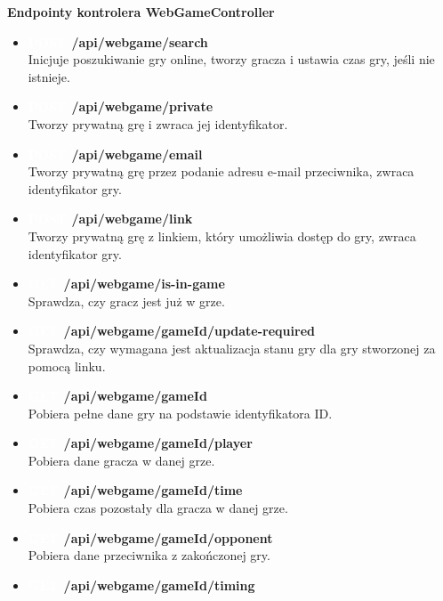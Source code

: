 \documentclass[12pt,a4paper]{article}
\begin{document}
\noindent  \textbf{Endpointy kontrolera WebGameController}
\begin{itemize} 
    \item \textbf{\colorbox{green!90}{\textcolor{white}{POST}} /api/webgame/search} \\
    Inicjuje poszukiwanie gry online, tworzy gracza i ustawia czas gry, jeśli nie istnieje. 
    \item \textbf{\colorbox{green!90}{\textcolor{white}{POST}} /api/webgame/private} \\
    Tworzy prywatną grę i zwraca jej identyfikator. 
    \item \textbf{\colorbox{green!90}{\textcolor{white}{POST}} /api/webgame/email} \\
    Tworzy prywatną grę przez podanie adresu e-mail przeciwnika, zwraca identyfikator gry. 
    \item \textbf{\colorbox{green!90}{\textcolor{white}{POST}} /api/webgame/link} \\
    Tworzy prywatną grę z linkiem, który umożliwia dostęp do gry, zwraca identyfikator gry. 
    \item \textbf{\colorbox{cyan!90}{\textcolor{white}{GET}} /api/webgame/is-in-game} \\
    Sprawdza, czy gracz jest już w grze. 
    \item \textbf{\colorbox{cyan!90}{\textcolor{white}{GET}} /api/webgame/{gameId}/update-required} \\
    Sprawdza, czy wymagana jest aktualizacja stanu gry dla gry stworzonej za pomocą linku. 
    \item \textbf{\colorbox{cyan!90}{\textcolor{white}{GET}} /api/webgame/{gameId}} \\
    Pobiera pełne dane gry na podstawie identyfikatora ID. 
    \item \textbf{\colorbox{cyan!90}{\textcolor{white}{GET}} /api/webgame/{gameId}/player} \\
    Pobiera dane gracza w danej grze. 
    \item \textbf{\colorbox{cyan!90}{\textcolor{white}{GET}} /api/webgame/{gameId}/time} \\
    Pobiera czas pozostały dla gracza w danej grze. 
    \item \textbf{\colorbox{cyan!90}{\textcolor{white}{GET}} /api/webgame/{gameId}/opponent} \\
    Pobiera dane przeciwnika z zakończonej gry. 
    \item \textbf{\colorbox{cyan!90}{\textcolor{white}{GET}} /api/webgame/{gameId}/timing} \\

\end{itemize}
\end{document}

